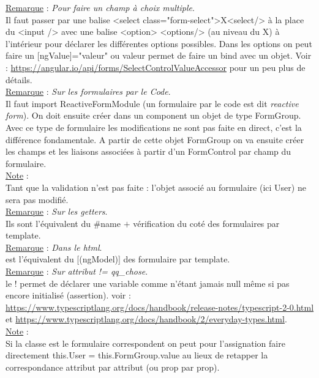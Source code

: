 \documentclass[a4paper,12pt,twoside]{article}
\newcommand{\incode}[1]{{\footnotesize\ttfamily #1}} %
\newcommand{\rem}[2]{\noindent\underline{Remarque} : \textit{#1}.\\ \indent #2}
\newcommand{\note}[1]{\noindent\underline{Note} : \\ \indent #1}
\begin{document}
\rem{Pour faire un champ à choix multiple}{Il faut passer par une balise <select class="form-select">X<select/> à la place du <input /> avec une balise <option> <options/> (au niveau du X) à l'intérieur pour déclarer les différentes options possibles. Dans les options on peut faire un [ngValue]="valeur" ou valeur permet de faire un bind avec un objet. Voir : \url{https://angular.io/api/forms/SelectControlValueAccessor} pour un peu plus de détails.}\\

\rem{Sur les formulaires par le Code}{Il faut import ReactiveFormModule (un formulaire par le code est dit \textit{reactive form}). On doit ensuite créer dans un component un objet de type FormGroup. Avec ce type de formulaire les modifications ne sont pas faite en direct, c'est la différence fondamentale. A partir de cette objet FormGroup on va ensuite créer les champs et les liaisons associées à partir d'un FormControl par champ du formulaire.}\\

\note{Tant que la validation n'est pas faite : l'objet associé au formulaire (ici User) ne sera pas modifié.}\\

\rem{Sur les getters}{Ils sont l'équivalent du \#name $+$ vérification du coté des formulaires par template.}\\

\rem{Dans le html}{[formControlName] est l'équivalent du [(ngModel)] des formulaire par template.}\\

\rem{Sur \incode{attribut != qq_chose}}{le ! permet de déclarer une variable comme n'étant jamais null même si pas encore initialisé (assertion). voir : \url{https://www.typescriptlang.org/docs/handbook/release-notes/typescript-2-0.html} et \url{https://www.typescriptlang.org/docs/handbook/2/everyday-types.html}.}\\

\note{Si la classe est le formulaire correspondent on peut pour l'assignation faire directement this.User = this.FormGroup.value au lieux de retapper la correspondance attribut par attribut (ou prop par prop).}\\






\end{document}
